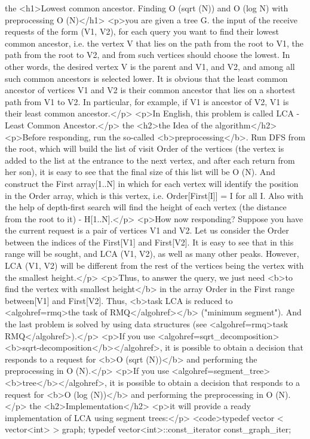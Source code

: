 the <h1>Lowest common ancestor. Finding O (sqrt (N)) and O (log N) with preprocessing O (N)</h1>
<p>you are given a tree G. the input of the receive requests of the form (V1, V2), for each query you want to find their lowest common ancestor, i.e. the vertex V that lies on the path from the root to V1, the path from the root to V2, and from such vertices should choose the lowest. In other words, the desired vertex V is the parent and V1, and V2, and among all such common ancestors is selected lower. It is obvious that the least common ancestor of vertices V1 and V2 is their common ancestor that lies on a shortest path from V1 to V2. In particular, for example, if V1 is ancestor of V2, V1 is their least common ancestor.</p>
<p>In English, this problem is called LCA - Least Common Ancestor.</p>
the <h2>the Idea of the algorithm</h2>
<p>Before responding, run the so-called <b>preprocessing</b>. Run DFS from the root, which will build the list of visit Order of the vertices (the vertex is added to the list at the entrance to the next vertex, and after each return from her son), it is easy to see that the final size of this list will be O (N). And construct the First array[1..N] in which for each vertex will identify the position in the Order array, which is this vertex, i.e. Order[First[I]] = I for all I. Also with the help of depth-first search will find the height of each vertex (the distance from the root to it) - H[1..N].</p>
<p>How now responding? Suppose you have the current request is a pair of vertices V1 and V2. Let us consider the Order between the indices of the First[V1] and First[V2]. It is easy to see that in this range will be sought, and LCA (V1, V2), as well as many other peaks. However, LCA (V1, V2) will be different from the rest of the vertices being the vertex with the smallest height.</p>
<p>Thus, to answer the query, we just need <b>to find the vertex with smallest height</b> in the array Order in the First range between[V1] and First[V2]. Thus, <b>task LCA is reduced to <algohref=rmq>the task of RMQ</algohref></b> ("minimum segment"). And the last problem is solved by using data structures (see <algohref=rmq>task RMQ</algohref>).</p>
<p>If you use <algohref=sqrt_decomposition><b>sqrt-decomposition</b></algohref>, it is possible to obtain a decision that responds to a request for <b>O (sqrt (N))</b> and performing the preprocessing in O (N).</p>
<p>If you use <algohref=segment_tree><b>tree</b></algohref>, it is possible to obtain a decision that responds to a request for <b>O (log (N))</b> and performing the preprocessing in O (N).</p>
the <h2>Implementation</h2>
<p>it will provide a ready implementation of LCA using segment trees:</p>
<code>typedef vector < vector<int> > graph;
typedef vector<int>::const_iterator const_graph_iter;


